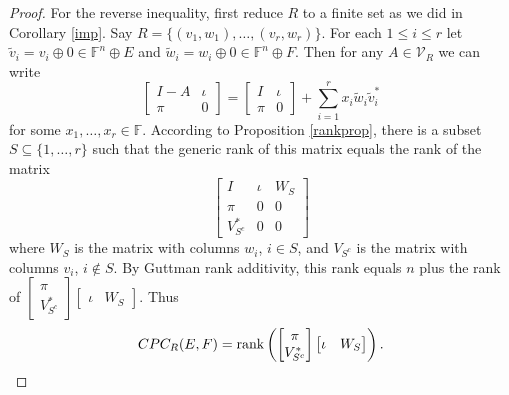 \documentclass{amsart}
\theoremstyle{definition}
\begin{document}
\begin{proof}
For the reverse inequality, first reduce $R$ to a finite set as we did in Corollary \ref{imp}. Say $R = \{(v_1, w_1), \ldots, (v_r, w_r)\}$. For each $1 \leq i \leq r$ let $\tilde{v}_i = v_i \oplus 0 \in \mathbb{F}^n \oplus E$ and $\tilde{w}_i = w_i \oplus 0 \in \mathbb{F}^n \oplus F$. Then for any $A \in \mathcal{V}_R$ we can write $$\left[\begin{matrix}I - A& \iota\\ \pi&0\end{matrix}\right] = \left[\begin{matrix}I& \iota\\ \pi&0\end{matrix}\right] + \sum_{i=1}^r x_i\tilde{w}_i\tilde{v}_i^*$$ for some $x_1, \ldots, x_r \in \mathbb{F}$. According to Proposition \ref{rankprop}, there is a subset $S \subseteq \{1, \ldots, r\}$ such that the generic rank of this matrix equals the rank of the matrix $$\left[\begin{matrix}I & \iota & W_S\\ \pi & 0 & 0\\ V_{S^c}^* & 0 & 0\end{matrix}\right]$$ where $W_S$ is the matrix with columns $w_i$, $i \in S$, and $V_{S^c}$ is the matrix with columns $v_i$, $i \not\in S$. By Guttman rank additivity, this rank equals $n$ plus the rank of $\left[\begin{matrix}\pi\\ V_{S^c}^*\end{matrix}\right]\left[\begin{matrix}\iota & W_S\end{matrix}\right]$. Thus $$CPC_R(E,F) = {\rm rank}\left(\left[\begin{matrix}\pi\\ V_{S^c}^*\end{matrix}\right]\left[\begin{matrix}\iota & W_S\end{matrix}\right]\right).$$


\end{proof}
\end{document}
